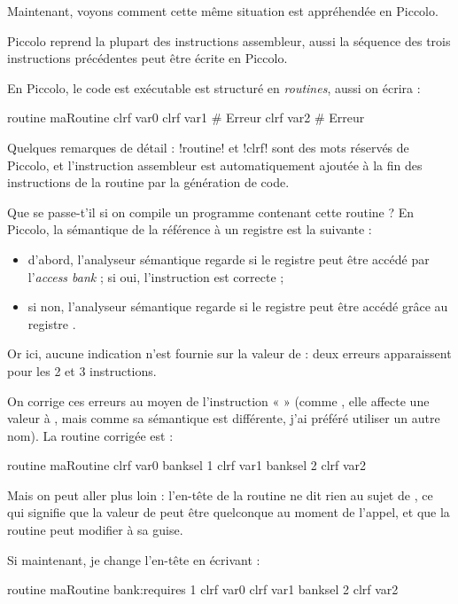 Maintenant, voyons comment cette même situation est appréhendée en Piccolo.

Piccolo reprend la plupart des instructions assembleur, aussi la séquence des trois instructions précédentes peut être écrite en Piccolo.

En Piccolo, le code est exécutable est structuré en \emph{routines}, aussi on écrira :
\begin{piccolo}
routine maRoutine {
  clrf  var0
  clrf  var1  # Erreur
  clrf  var2  # Erreur
}
\end{piccolo}

Quelques remarques de détail : \pic!routine! et \pic!clrf! sont des mots réservés de Piccolo, et l’instruction assembleur  est automatiquement ajoutée à la fin des instructions de la routine par la génération de code.

Que se passe-t'il si on compile un programme contenant cette routine ? En Piccolo, la sémantique de la référence à un registre est la suivante :\begin{itemize}
\item d'abord, l'analyseur sémantique regarde si le registre peut être accédé par l'\emph{access bank} ; si oui, l'instruction est correcte ;
\item si non, l'analyseur sémantique regarde si le registre peut être accédé grâce au registre .
\end{itemize}

Or ici, aucune indication n'est fournie sur la valeur de  : deux erreurs apparaissent pour les 2 et 3 instructions.

On corrige ces erreurs au moyen de l’instruction «  » (comme , elle affecte une valeur à , mais comme sa sémantique est différente, j’ai préféré utiliser un autre nom). La routine corrigée est :
\begin{piccolo}
routine maRoutine {
  clrf  var0
  banksel 1
  clrf  var1
  banksel 2
  clrf  var2
}
\end{piccolo}


Mais on peut aller plus loin : l’en-tête de la routine ne dit rien au sujet de , ce qui signifie que la valeur de  peut être quelconque au moment de l’appel, et que la routine peut modifier  à sa guise.

Si maintenant, je change l’en-tête en écrivant :
\begin{piccolo}
routine maRoutine bank:requires 1 {
  clrf  var0
  clrf  var1
  banksel 2
  clrf  var2
}
\end{piccolo}

